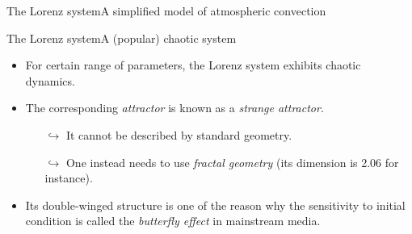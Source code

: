 \documentclass[usenames,dvipsnames,svgnames,10pt,aspectratio=169]{beamer}
\begin{document}
\begin{frame}[t, c]{The Lorenz system}{A simplified model of atmospheric convection}
	\vspace{1cm}
\end{frame}

\begin{frame}[t, c]{The Lorenz system}{A (popular) chaotic system}
	\begin{minipage}{.38\textwidth}
		\centering
	\end{minipage}%
	\hfill
	\begin{minipage}{.58\textwidth}
		\begin{itemize}
			\item For certain range of parameters, the Lorenz system exhibits chaotic dynamics.

			\medskip

			\item The corresponding \emph{attractor} is known as a \emph{strange attractor}.
			\begin{itemize}
				\item[\( \hookrightarrow \)] It cannot be described by standard geometry.
				\item[\( \hookrightarrow \)] One instead needs to use \emph{fractal geometry} (its dimension is 2.06 for instance).
			\end{itemize}

			\medskip

			\item Its double-winged structure is one of the reason why the sensitivity to initial condition is called the \emph{butterfly effect} in mainstream media.
		\end{itemize}
	\end{minipage}

	\vspace{1cm}
\end{frame}
\end{document}
